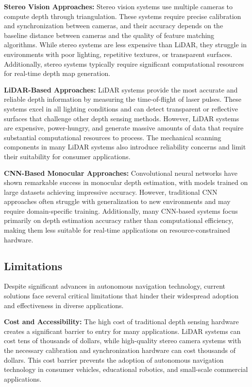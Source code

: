 \documentclass[conference]{IEEEtran}
\begin{document}
\textbf{Stereo Vision Approaches:} Stereo vision systems use multiple cameras to compute depth through triangulation. These systems require precise calibration and synchronization between cameras, and their accuracy depends on the baseline distance between cameras and the quality of feature matching algorithms. While stereo systems are less expensive than LiDAR, they struggle in environments with poor lighting, repetitive textures, or transparent surfaces. Additionally, stereo systems typically require significant computational resources for real-time depth map generation.

\textbf{LiDAR-Based Approaches:} LiDAR systems provide the most accurate and reliable depth information by measuring the time-of-flight of laser pulses. These systems excel in all lighting conditions and can detect transparent or reflective surfaces that challenge other depth sensing methods. However, LiDAR systems are expensive, power-hungry, and generate massive amounts of data that require substantial computational resources to process. The mechanical scanning components in many LiDAR systems also introduce reliability concerns and limit their suitability for consumer applications.

\textbf{CNN-Based Monocular Approaches:} Convolutional neural networks have shown remarkable success in monocular depth estimation, with models trained on large datasets achieving impressive accuracy. However, traditional CNN approaches often struggle with generalization to new environments and may require domain-specific training. Additionally, many CNN-based systems focus primarily on depth estimation accuracy rather than computational efficiency, making them less suitable for real-time applications on resource-constrained hardware.

\subsection{Limitations}
Despite significant advances in autonomous navigation technology, current solutions face several critical limitations that hinder their widespread adoption and effectiveness in diverse applications.

\textbf{Cost and Accessibility:} The high cost of traditional depth sensing hardware creates a significant barrier to entry for many applications. LiDAR systems can cost tens of thousands of dollars, while high-quality stereo camera systems with the necessary calibration and synchronization hardware can cost thousands of dollars. This cost barrier prevents the adoption of autonomous navigation technology in consumer vehicles, educational robotics, and small-scale commercial applications.
\end{document}

